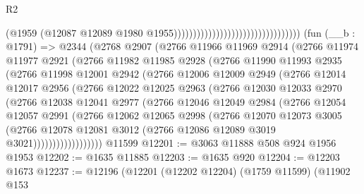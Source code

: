 \begin{lexlean}{R2}
\begin{coremodule}
                                                                  (@1959
                                                                    (@12087
                                                                      @12089
                                                                      @1980
                                                                      @1955)))))))))))))))))))))))))))))))))
    (fun (__b : @1791) =>
    @2344
      (@2768
        @2907
        (@2766
          @11966
          @11969
          @2914
          (@2766
            @11974
            @11977
            @2921
            (@2766
              @11982
              @11985
              @2928
              (@2766
                @11990
                @11993
                @2935
                (@2766
                  @11998
                  @12001
                  @2942
                  (@2766
                    @12006
                    @12009
                    @2949
                    (@2766
                      @12014
                      @12017
                      @2956
                      (@2766
                        @12022
                        @12025
                        @2963
                        (@2766
                          @12030
                          @12033
                          @2970
                          (@2766
                            @12038
                            @12041
                            @2977
                            (@2766
                              @12046
                              @12049
                              @2984
                              (@2766
                                @12054
                                @12057
                                @2991
                                (@2766
                                  @12062
                                  @12065
                                  @2998
                                  (@2766
                                    @12070
                                    @12073
                                    @3005
                                    (@2766
                                      @12078
                                      @12081
                                      @3012
                                      (@2766 @12086 @12089 @3019 @3021))))))))))))))))))
    @11599
@12201 := @3063 @11888 @508 @924 @1956 @1953
@12202 := @1635 @11885
@12203 := @1635 @920
@12204 := @12203 @1673
@12237 := @12196
    (@12201
      (@12202 @12204)
      (@1759 @11599)
      (@11902
        @153

\end{coremodule}
\end{lexlean}
